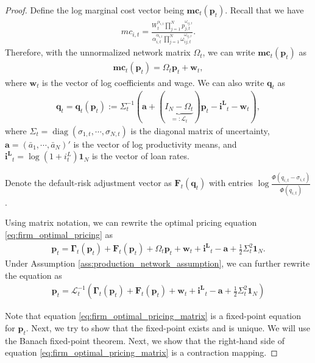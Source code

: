 \documentclass[12pt]{article}
\numberwithin{equation}{section}
\begin{document}
\begin{appendix}
\begin{proof}
    Define the log marginal cost vector being $\mathbf{mc}_t(\mathbf{p}_t)$. Recall that we have
    \begin{align*}
        {mc}_{i,t} = \frac{W_t^{\alpha_{i,t}} \prod_{j=1}^N p_{j,t}^{\omega_{ij,t}}}{\alpha_{i,t}^{\alpha_{i,t}} \prod_{j=1}^N \omega_{ij,t}^{\omega_{ij,t}}}.
    \end{align*}
    Therefore, with the unnormalized network matrix $\Omega_t$, we can write $\mathbf{mc}_t(\mathbf{p}_t)$ as
    \begin{align*}
        \mathbf{mc}_t(\mathbf{p}_t) = \Omega_t \mathbf{p}_t + \mathbf{w}_t,
    \end{align*}
    where $\mathbf{w}_t$ is the vector of log coefficients and wage. We can also write $\mathbf{q}_t$ as
    \begin{align*}
        \mathbf{q}_t = \mathbf{q}_t(\mathbf{p}_t) := \Sigma_t^{-1} \left(\mathbf{a} + (\underbrace{I_N - \Omega_t}_{=: \mathcal{L}_t})\mathbf{p}_t - \mathbf{i^L}_t - \mathbf{w}_t\right),
    \end{align*}
    where $\Sigma_t = \operatorname{diag}(\sigma_{1,t}, \cdots, \sigma_{N,t})$ is the diagonal matrix of uncertainty, $\mathbf{a} = (\bar a_1, \cdots, \bar a_N)'$ is the vector of log productivity means, and $\mathbf{i^L}_t = \log(1+i^L_t) \mathbf{1}_N$ is the vector of loan rates.
    
    Denote the default-risk adjustment vector as $\mathbf{F}_t(\mathbf{q}_t)$ with entries $\log \frac{\Phi(q_{i,t} - \sigma_{i,t})}{\Phi(q_{i,t})}$.

    Using matrix notation, we can rewrite the optimal pricing equation \eqref{eq:firm_optimal_pricing} as
    \begin{align*}
        \mathbf{p}_t = \mathbf{\Gamma}_t(\mathbf{p}_t) + \mathbf{F}_t(\mathbf{p}_t) + \Omega_t \mathbf{p}_t + \mathbf{w}_t + \mathbf{i^L}_t - \mathbf{a} + \frac12 \Sigma^2_t \mathbf{1}_N.
    \end{align*}
    Under Assumption \ref{ass:production_network_assumption}, we can further rewrite the equation as
    \begin{align}\label{eq:firm_optimal_pricing_matrix}
        \mathbf{p}_t = \mathcal{L}^{-1}_t \left(\mathbf{\Gamma}_t(\mathbf{p}_t) + \mathbf{F}_t(\mathbf{p}_t) + \mathbf{w}_t + \mathbf{i^L}_t - \mathbf{a} + \frac12 \Sigma^2_t \mathbf{1}_N\right)
    \end{align}

    Note that equation \eqref{eq:firm_optimal_pricing_matrix} is a fixed-point equation for $\mathbf{p}_t$. Next, we try to show that the fixed-point exists and is unique. We will use the Banach fixed-point theorem. Next, we show that the right-hand side of equation \eqref{eq:firm_optimal_pricing_matrix} is a contraction mapping.


\end{proof}


\end{appendix}
\end{document}
